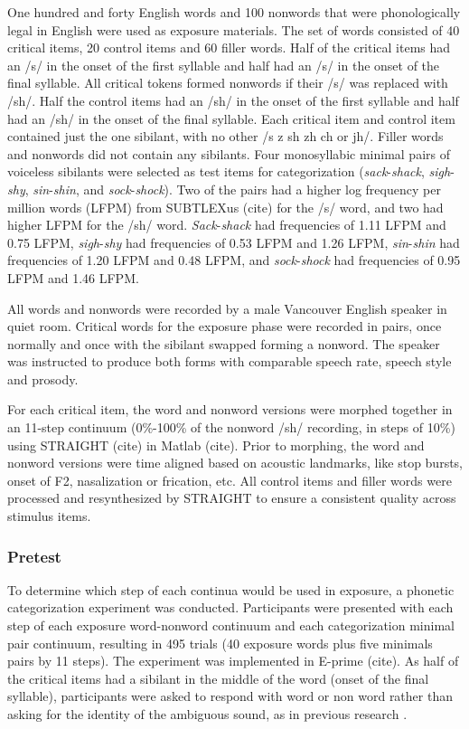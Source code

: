One hundred and forty English words and 100 nonwords that were phonologically legal in English were used as exposure materials.  The set of words consisted of 40 critical items, 20 control items and 60 filler words.  Half of the critical items had an /s/ in the onset of the first syllable and half had an /s/ in the onset of the final syllable.  All critical tokens formed nonwords if their /s/ was replaced with /sh/. Half the control items had an /sh/ in the onset of the first syllable and half had an /sh/ in the onset of the final syllable.  Each critical item and control item contained just the one sibilant, with no other /s z sh zh ch or jh/.  Filler words and nonwords did not contain any sibilants.  Four monosyllabic minimal pairs of voiceless sibilants were selected as test items for categorization (\emph{sack}-\emph{shack}, \emph{sigh}-\emph{shy}, \emph{sin}-\emph{shin}, and \emph{sock}-\emph{shock}).  Two of the pairs had a higher log frequency per million words (LFPM) from SUBTLEXus (cite) for the /s/ word, and two had higher LFPM for the /sh/ word.  \emph{Sack}-\emph{shack} had frequencies of 1.11  LFPM and 0.75  LFPM, \emph{sigh}-\emph{shy} had frequencies of 0.53  LFPM and 1.26  LFPM, \emph{sin}-\emph{shin} had frequencies of 1.20  LFPM and 0.48  LFPM, and \emph{sock}-\emph{shock} had frequencies of 0.95  LFPM and 1.46 LFPM.

All words and nonwords were recorded by a male Vancouver English speaker in quiet room.  Critical words for the exposure phase were recorded in pairs, once normally and once with the sibilant swapped forming a nonword.  The speaker was instructed to produce both forms with comparable speech rate, speech style and prosody.

For each critical item, the word and nonword versions were morphed together in an 11-step continuum (0\%-100\% of the nonword /sh/ recording, in steps of 10\%) using STRAIGHT (cite) in Matlab (cite).  Prior to morphing, the word and nonword versions were time aligned based on acoustic landmarks, like stop bursts, onset of F2, nasalization or frication, etc.  All control items and filler words were processed and resynthesized by STRAIGHT to ensure a consistent quality across stimulus items.

\subsubsection{Pretest}

To determine which step of each continua would be used in exposure, a phonetic categorization experiment was conducted.  Participants were presented with each step of each exposure word-nonword continuum and each categorization minimal pair continuum, resulting in 495 trials (40 exposure words plus five minimals pairs by 11 steps).  The experiment was implemented in E-prime (cite).  As half of the critical items had a sibilant in the middle of the word (onset of the final syllable), participants were asked to respond with word or non word rather than asking for the identity of the ambiguous sound, as in previous research \citep{Reinisch2013}.  

